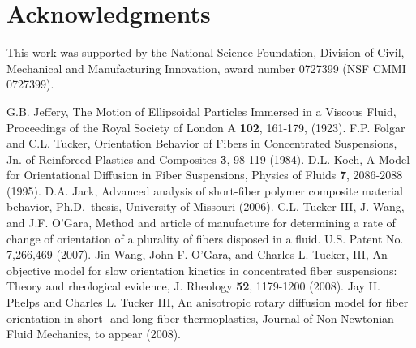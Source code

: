 \documentclass{amsart}
\begin{document}
\section*{Acknowledgments}

\noindent
This work was supported by the National Science Foundation, Division of Civil, Mechanical and Manufacturing Innovation, award number 0727399 (NSF CMMI 0727399).

\begin{thebibliography}{99}
G.B. Jeffery, The Motion of Ellipsoidal Particles Immersed in a Viscous Fluid, Proceedings of the Royal Society of London A {\bf 102}, 161-179, (1923).
F.P. Folgar and C.L. Tucker, Orientation Behavior of Fibers in Concentrated Suspensions, Jn. of Reinforced Plastics and Composites {\bf 3}, 98-119 (1984).
D.L. Koch, A Model for Orientational Diffusion in Fiber Suspensions, Physics of Fluids {\bf 7}, 2086-2088 (1995).
D.A. Jack, Advanced analysis of short-fiber polymer composite material behavior, Ph.D.\ thesis, University of Missouri (2006).
C.L. Tucker III, J. Wang, and J.F. O'Gara, Method and article of manufacture for determining a rate of change of orientation of a plurality of fibers disposed in a fluid. U.S. Patent No. 7,266,469 (2007).
Jin Wang, John F. O'Gara, and Charles L. Tucker, III, An objective model for slow orientation kinetics in concentrated fiber suspensions: Theory and rheological evidence, J. Rheology {\bf 52}, 1179-1200 (2008).
Jay H. Phelps and Charles L. Tucker III, An anisotropic rotary diffusion model for fiber orientation in short- and long-fiber thermoplastics, Journal of Non-Newtonian Fluid Mechanics, to appear (2008).
\end{thebibliography}
\end{document}
